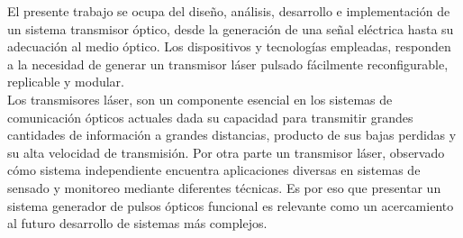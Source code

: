 


\begin{abstracts}        %

    El presente trabajo se ocupa del diseño, análisis, desarrollo e implementación de un sistema transmisor óptico, desde la generación de una señal eléctrica hasta su adecuación al medio óptico.
    Los dispositivos y tecnologías empleadas, responden a la necesidad de generar un transmisor láser pulsado
    fácilmente reconfigurable, replicable y modular.\\
    
    Los transmisores láser, son un componente esencial en los sistemas de comunicación ópticos actuales dada su capacidad
    para transmitir grandes cantidades de información a grandes distancias, producto de sus bajas perdidas y su alta velocidad de transmisión.
    Por otra parte un transmisor láser, observado cómo sistema independiente encuentra aplicaciones diversas en sistemas de sensado y monitoreo mediante diferentes técnicas. Es por eso que presentar un sistema generador de pulsos ópticos funcional es relevante como un acercamiento al futuro desarrollo de sistemas más complejos. 






    
    

\end{abstracts}


